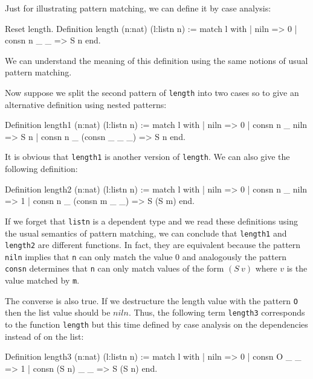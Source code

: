 Just for illustrating pattern matching, 
we can define it by case analysis:

\begin{coq_example}
Reset length.
Definition length (n:nat) (l:listn n) :=
  match l with
  | niln => 0%
  | consn n _ _ => S n
  end.
\end{coq_example}

We can understand the meaning of this definition using the
same notions of usual pattern matching.

%
%
\iffalse
Now suppose we split the second pattern  of \texttt{length} into two 
cases so to give an
alternative definition using nested patterns:
\begin{coq_example}
Definition length1 (n:nat) (l:listn n) :=
  match l with
  | niln => 0%
  | consn n _ niln => S n
  | consn n _ (consn _ _ _) => S n
  end.
\end{coq_example}

It is obvious that \texttt{length1} is  another version of
\texttt{length}. We can also give the following definition:
\begin{coq_example}
Definition length2 (n:nat) (l:listn n) :=
  match l with
  | niln => 0%
  | consn n _ niln => 1%
  | consn n _ (consn m _ _) => S (S m)
  end.
\end{coq_example}

If we forget that \texttt{listn} is a dependent type and we read these
definitions using the usual semantics of pattern matching,  we can conclude
that \texttt{length1}
and \texttt{length2} are different functions.
In fact, they are equivalent
because the pattern \texttt{niln} implies that \texttt{n} can only match
the value $0$ and analogously the pattern \texttt{consn} determines that \texttt{n} can
only match  values of the form  $(S~v)$ where $v$ is the value matched by
\texttt{m}. 

The converse is also true. If
we destructure the  length  value with the pattern \texttt{O} then the list
value should be $niln$. 
Thus, the following term \texttt{length3} corresponds to the function
\texttt{length} but this time defined by case analysis on the dependencies instead of on the list:

\begin{coq_example}
Definition length3 (n:nat) (l:listn n) :=
  match l with
  | niln => 0%
  | consn O _ _ => 1%
  | consn (S n) _ _ => S (S n)
  end.
\end{coq_example}

